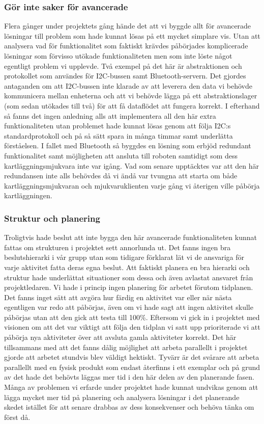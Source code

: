 \documentclass{article}
\begin{document}
\subsubsection{Gör inte saker för avancerade}
Flera gånger under projektets gång hände det att vi byggde allt för avancerade lösningar till problem som hade kunnat lösas på ett mycket simplare vis. Utan att analysera vad för funktionalitet som faktiskt krävdes påbörjades komplicerade lösningar som förvisso utökade funktionaliteten men som inte löste något egentligt problem vi upplevde. Två exempel på det här är abstraktionen och protokollet som användes för I2C-bussen samt Bluetooth-servern. Det gjordes antaganden om att I2C-bussen inte klarade av att leverera den data vi behövde kommunicera mellan enheterna och att vi behövde lägga på ett abstraktionslager (som sedan utökades till två) för att få dataflödet att fungera korrekt. I efterhand så fanns det ingen anledning alls att implementera all den här extra funktionaliteten utan problemet hade kunnat lösas genom att följa I2C:s standardprotokoll och på så sätt spara in många timmar samt underlätta förståelsen. I fallet med Bluetooth så byggdes en lösning som erbjöd redundant funktionalitet samt möjligheten att ansluta till roboten samtidigt som dess kartläggningsmjukvara inte var igång. Vad som senare upptäcktes var att den här redundansen inte alls behövdes då vi ändå var tvungna att starta om både kartläggningsmjukvaran och mjukvaruklienten varje gång vi återigen ville påbörja kartläggningen.

\subsubsection{Struktur och planering}
Troligtvis hade beslut att inte bygga den här avancerade funktionaliteten kunnat fattas om strukturen i projektet sett annorlunda ut. Det fanns ingen bra beslutshierarki i vår grupp utan som tidigare förklarat lät vi de ansvariga för varje aktivitet fatta deras egna beslut. Att faktiskt planera en bra hierarki och struktur hade underlättat situationer som dessa och även avlastat ansvaret från projektledaren.
\newline\newline
Vi hade i princip ingen planering för arbetet förutom tidplanen. Det fanns inget sätt att avgöra hur färdig en aktivitet var eller när nästa egentligen var redo att påbörjas, även om vi hade sagt att ingen aktivitet skulle påbörjas utan att den gick att testa till 100\%. Eftersom vi gick in i projektet med visionen om att det var viktigt att följa den tidplan vi satt upp prioriterade vi att påbörja nya aktiviteter över att avsluta gamla aktiviteter korrekt. Det här tillsammans med att det fanns dålig möjlighet att arbeta parallellt i projektet gjorde att arbetet stundvis blev väldigt hektiskt. Tyvärr är det svårare att arbeta parallellt med en fysisk produkt som endast återfinns i ett exemplar och på grund av det hade det behövts läggas mer tid i den här delen av den planerande fasen. Många av problemen vi erfarde under projektet hade kunnat undvikas genom att lägga mycket mer tid på planering och analysera lösningar i det planerande skedet istället för att senare drabbas av dess konsekvenser och behöva tänka om först då.
\end{document}
